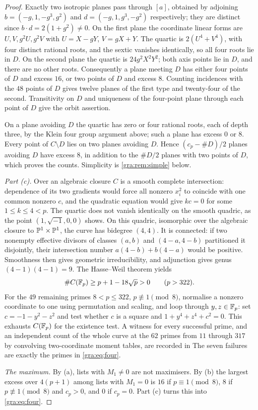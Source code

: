 \begin{proof}
Exactly two isotropic planes pass through $[a]$, obtained by adjoining
$b=(-g,1,-g^3,g^2)$ and $d=(-g,1,g^3,-g^2)$ respectively; they are
distinct since $b\cdot d=2(1+g^2)\ne0$. On the first plane the coordinate
linear forms are $U,V,g^2U,g^2V$ with $U=X-gY$, $V=gX+Y$. The quartic is
$2(U^4+V^4)$, with four distinct rational roots, and the sextic vanishes
identically, so all four roots lie in $D$. On the second plane the quartic
is $24g^2X^2Y^2$; both axis points lie in $D$, and there are no other
roots. Consequently a plane meeting $D$ has either four points of $D$ and
excess $16$, or two points of $D$ and excess $8$. Counting incidences with
the $48$ points of $D$ gives twelve planes of the first type and
twenty-four of the second. Transitivity on $D$ and uniqueness of the
four-point plane through each point of $D$ give the orbit assertion.

On a plane avoiding $D$ the quartic has zero or four rational roots, each
of depth three, by the Klein four group argument above; such a plane has
excess $0$ or $8$. Every point of $C\setminus D$ lies on two planes
avoiding $D$. Hence $(c_p-\#D)/2$ planes avoiding $D$ have excess $8$, in
addition to the $\#D/2$ planes with two points of $D$, which proves the
counts. Simplicity is \cref{gra:rem:simple} below.

\emph{Part \textup{(c)}.} Over an algebraic closure $C$ is a smooth
complete intersection: dependence of its two gradients would force all
nonzero $x_i^2$ to coincide with one common nonzero $c$, and the quadratic
equation would give $kc=0$ for some $1\le k\le4<p$. The quartic does not
vanish identically on the smooth quadric, as the point $(1,\sqrt{-1},0,0)$
shows. On this quadric, isomorphic over the algebraic closure to
$\mathbb{P}^1\times\mathbb{P}^1$, the curve has bidegree $(4,4)$. It is connected:
if two nonempty effective divisors of classes $(a,b)$ and $(4-a,4-b)$
partitioned it disjointly, their intersection number $a(4-b)+b(4-a)$ would
be positive. Smoothness then gives geometric irreducibility, and
adjunction gives genus $(4-1)(4-1)=9$. The Hasse--Weil theorem
\cite{Weil1948Courbes} yields
\[
 \#C(\mathbb{F}_p)\ge p+1-18\sqrt p>0\qquad(p>322).
\]
For the $49$ remaining primes $8<p\le322$, $p\not\equiv1\pmod8$, normalise
a nonzero coordinate to one using permutation and scaling, and loop
through $y,z\in\mathbb{F}_p$: set $c=-1-y^2-z^2$ and test whether $c$ is a square
and $1+y^4+z^4+c^2=0$. This exhausts $C(\mathbb{F}_p)$ for the existence test.
A witness for every successful prime, and an independent count of the
whole curve at the $62$ primes from $11$ through $317$ by convolving
two-coordinate moment tables, are recorded in
The seven failures are exactly the primes in \eqref{gra:eq:four}.

\emph{The maximum.} By (a), lists with $M_1\ne0$ are not maximisers. By
(b) the largest excess over $4(p+1)$ among lists with $M_1=0$ is $16$ if
$p\equiv1\pmod8$, $8$ if $p\not\equiv1\pmod8$ and $c_p>0$, and $0$ if
$c_p=0$. Part (c) turns this into \eqref{gra:eq:four}.
\end{proof}

